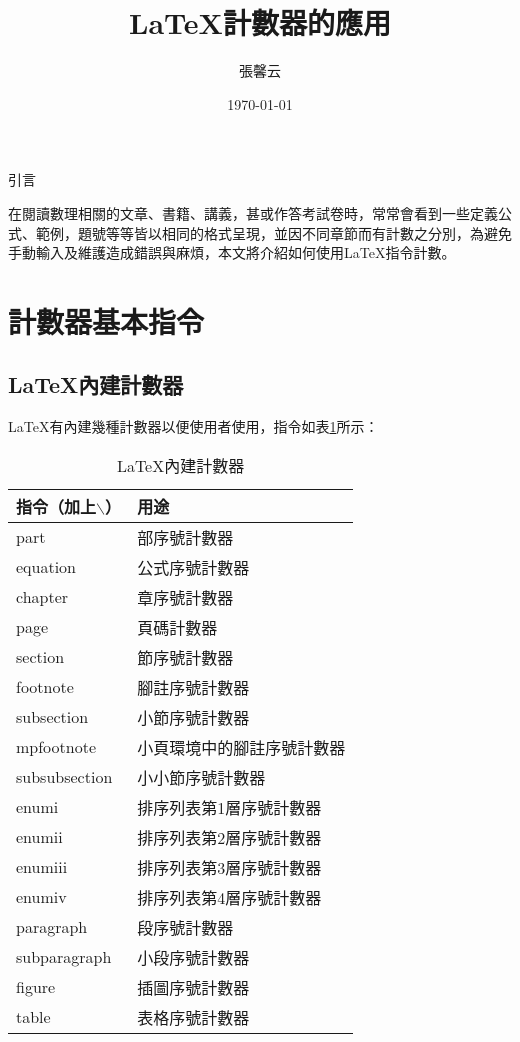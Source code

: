   


\title{ \LaTeX{\UD 計數器的應用}}
\author{{\NC 張馨云}\;\; {}}
\date{{\BR \today}} 	


\maketitle
\fontsize{12}{22 pt}\selectfont

\centerline{{\BCF 引言}}
\setlength{\parindent}{2em} 
	在閱讀數理相關的文章、書籍、講義，甚或作答考試卷時，常常會看到一些定義公式、範例，題號等等皆以相同的格式呈現，並因不同章節而有計數之分別，為避免手動輸入及維護造成錯誤與麻煩，本文將介紹如何使用\LaTeX 指令計數。

\newpage
\section{\HC 計數器基本指令}
\subsection{{\HC \LaTeX 內建計數器}}
	\LaTeX 有內建幾種計數器以便使用者使用，指令如表\ref{counterx_latex}所示：

\begin{table}[H]
\centering
\extrarowheight=4pt
\caption{\LaTeX 內建計數器}\label{counterx_latex}
	\begin{tabular}{ll}
	\hline
	指令（加上$\backslash$） \quad &  \quad 用途  \\
	\hline
	part & 部序號計數器 \\
	\rowcolor{lavendergray}
	equation & 公式序號計數器 \\
	chapter & 章序號計數器 \\
	\rowcolor{lavendergray}
	page & 頁碼計數器 \\
	section & 節序號計數器 \\
	\rowcolor{lavendergray}
	footnote & 腳註序號計數器 \\
	subsection & 小節序號計數器 \\
	\rowcolor{lavendergray}
	mpfootnote & 小頁環境中的腳註序號計數器 \\
	subsubsection & 小小節序號計數器 \\
	\rowcolor{lavendergray}
	enumi & 排序列表第1層序號計數器 \\
	enumii & 排序列表第2層序號計數器\\
	\rowcolor{lavendergray}
	enumiii & 排序列表第3層序號計數器 \\
	enumiv & 排序列表第4層序號計數器 \\
	\rowcolor{lavendergray}
	paragraph & 段序號計數器 \\
	subparagraph & 小段序號計數器 \\
	\rowcolor{lavendergray}
	figure & 插圖序號計數器 \\
	table & 表格序號計數器  \\
	\hline
	\end{tabular}
\end{table}


